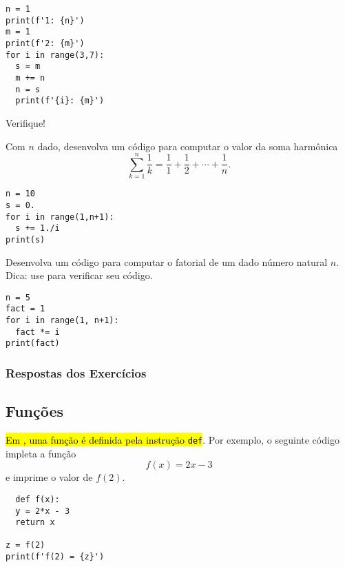 \begin{lstlisting}
n = 1
print(f'1: {n}')
m = 1
print(f'2: {m}')
for i in range(3,7):
  s = m
  m += n
  n = s
  print(f'{i}: {m}')
\end{lstlisting}

Verifique!

\begin{exer}
  Com $n$ dado, desenvolva um código para computar o valor da soma harmônica
  \begin{equation}
    \sum_{k=1}^n \frac{1}{k} = \frac{1}{1} + \frac{1}{2} + \cdots + \frac{1}{n}.
  \end{equation}
\end{exer}
\begin{resp}
  
\begin{lstlisting}
n = 10
s = 0.
for i in range(1,n+1):
  s += 1./i
print(s)
\end{lstlisting}

\end{resp}

\begin{exer}
  Desenvolva um código para computar o fatorial de um dado número natural $n$. Dica: use {\PYTHONmathDOTfactorial} para verificar seu código.
\end{exer}
\begin{resp}
  
\begin{lstlisting}
n = 5
fact = 1
for i in range(1, n+1):
  fact *= i
print(fact)
\end{lstlisting}

\end{resp}

\ifisbook 
\subsubsection*{Respostas dos Exercícios}
\shipoutAnswer
\fi


\subsection{Funções}

\hl{Em {\python}, uma função é definida pela instrução \texttt{def}}. Por exemplo, o seguinte código impleta a função
\begin{equation}
  f(x) = 2x - 3
\end{equation}
e imprime o valor de $f(2)$.

\begin{lstlisting}
  def f(x):
  y = 2*x - 3
  return x

z = f(2)
print(f'f(2) = {z}')
\end{lstlisting}

